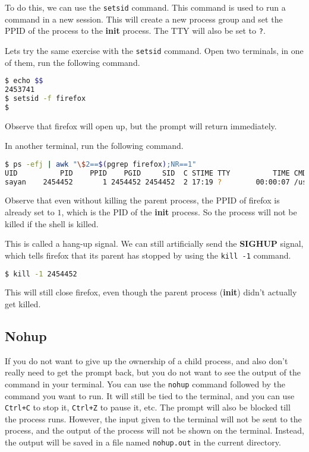 To do this, we can use the \texttt{setsid} command. This command is used to
run a command in a new session. This will create a new process group and
set the PPID of the process to the \textbf{init} process. The TTY will also
be set to \texttt{?}.

Lets try the same exercise with the \texttt{setsid} command.
Open two terminals, in one of them, run the following command.

\begin{lstlisting}[language=bash]
$ echo $$
2453741
$ setsid -f firefox
$
\end{lstlisting}

Observe that firefox will open up, but the prompt will return immediately.

In another terminal, run the following command.

\begin{lstlisting}[language=bash]
$ ps -efj | awk "\$2==$(pgrep firefox);NR==1"
UID          PID    PPID    PGID     SID  C STIME TTY          TIME CMD
sayan    2454452       1 2454452 2454452  2 17:19 ?        00:00:07 /usr/lib/firefox/firefox
\end{lstlisting}

Observe that even without killing the parent process, the PPID of firefox is
already set to $1$, which is the PID of the \textbf{init} process.
So the process will not be killed if the shell is killed.

This is called a hang-up signal. We can still artificially send the
\textbf{SIGHUP} signal, which tells firefox that its parent has stopped
by using the \texttt{kill -1} command.

\begin{lstlisting}[language=bash]
$ kill -1 2454452
\end{lstlisting}

This will still close firefox, even though the parent process (\textbf{init})
didn't actually get killed.

\subsection{Nohup}

If you do not want to give up the ownership of a child process,
and also don't really need to get the prompt back, but you do not
want to see the output of the command in your terminal. You can
use the \texttt{nohup} command followed by the command you want to
run. It will still be tied to the terminal, and you can use
\texttt{Ctrl+C} to stop it, \texttt{Ctrl+Z} to pause it, etc.
The prompt will also be blocked till the process runs.
However, the input given to the terminal will not be sent
to the process, and the output of the process will not be
shown on the terminal. Instead, the output will be saved
in a file named \texttt{nohup.out} in the current directory.

